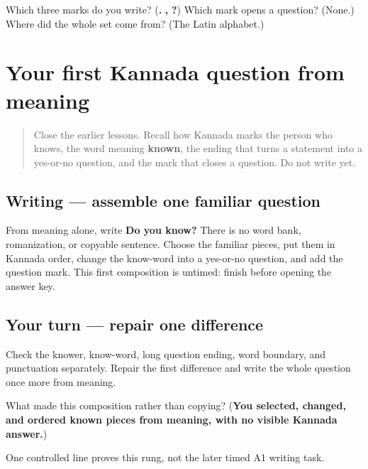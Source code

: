 \begin{tcolorbox}[breakable,colback=teal!4,colframe=teal!35!black,title={Before you move on}]
Which three marks do you write? (\textbf{.} \textbf{,} \textbf{?}) Which mark opens a question? (None.) Where did the whole set come from? (The Latin alphabet.)
\end{tcolorbox}
\section[\texorpdfstring{\kn{ನಿಮಗೆ} \kn{ಗೊತ್ತಾ}? (nimage gottā?)}{ನಿಮಗೆ ಗೊತ್ತಾ? (nimage gottā?)}]{Your first Kannada question from meaning}

\label{lesson:KA-W77-gotta-controlled-question}



\begin{quote}
Close the earlier lessons. Recall how Kannada marks the person who knows, the word meaning \textbf{known}, the ending that turns a statement into a yes-or-no question, and the mark that closes a question. Do not write yet.
\end{quote}

\subsection*{Writing — assemble one familiar question}
From meaning alone, write \textbf{Do you know?} There is no word bank, romanization, or copyable sentence. Choose the familiar pieces, put them in Kannada order, change the know-word into a yes-or-no question, and add the question mark. This first composition is untimed: finish before opening the answer key.

\subsection*{Your turn — repair one difference}
Check the knower, know-word, long question ending, word boundary, and punctuation separately. Repair the first difference and write the whole question once more from meaning.

\begin{tcolorbox}[breakable,colback=teal!4,colframe=teal!35!black,title={Before you move on}]
What made this composition rather than copying? (\textbf{You selected, changed, and ordered known pieces from meaning, with no visible Kannada answer.})

One controlled line proves this rung, not the later timed A1 writing task.
\end{tcolorbox}
